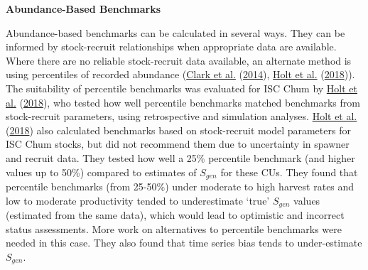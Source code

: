 \documentclass[11pt]{book}
\begin{document}
\textbf{Abundance-Based Benchmarks}

Abundance-based benchmarks can be calculated in several ways. They can be informed by stock-recruit relationships when appropriate data are available. Where there are no reliable stock-recruit data available, an alternate method is using percentiles of recorded abundance (\protect\hyperlink{ref-clarkEvaluationPercentileApproach2014}{Clark et al.} (\protect\hyperlink{ref-clarkEvaluationPercentileApproach2014}{2014}), \protect\hyperlink{ref-holtEvaluatingBenchmarksBiological2018}{Holt et al.} (\protect\hyperlink{ref-holtEvaluatingBenchmarksBiological2018}{2018})). The suitability of percentile benchmarks was evaluated for ISC Chum by \protect\hyperlink{ref-holtEvaluatingBenchmarksBiological2018}{Holt et al.} (\protect\hyperlink{ref-holtEvaluatingBenchmarksBiological2018}{2018}), who tested how well percentile benchmarks matched benchmarks from stock-recruit parameters, using retrospective and simulation analyses. \protect\hyperlink{ref-holtEvaluatingBenchmarksBiological2018}{Holt et al.} (\protect\hyperlink{ref-holtEvaluatingBenchmarksBiological2018}{2018}) also calculated benchmarks based on stock-recruit model parameters for ISC Chum stocks, but did not recommend them due to uncertainty in spawner and recruit data. They tested how well a 25\% percentile benchmark (and higher values up to 50\%) compared to estimates of \(S_{gen}\) for these CUs. They found that percentile benchmarks (from 25-50\%) under moderate to high harvest rates and low to moderate productivity tended to underestimate `true' \(S_{gen}\) values (estimated from the same data), which would lead to optimistic and incorrect status assessments. More work on alternatives to percentile benchmarks were needed in this case. They also found that time series bias tends to under-estimate \(S_{gen}\).
\end{document}
